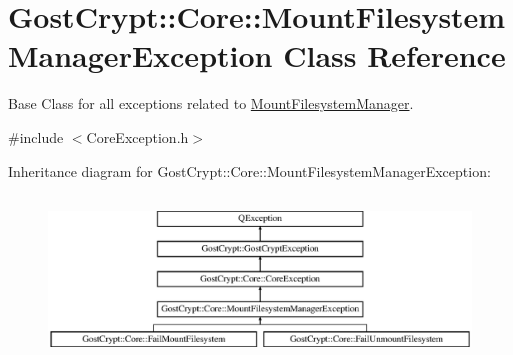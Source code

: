 \hypertarget{class_gost_crypt_1_1_core_1_1_mount_filesystem_manager_exception}{}\section{Gost\+Crypt\+:\+:Core\+:\+:Mount\+Filesystem\+Manager\+Exception Class Reference}
\label{class_gost_crypt_1_1_core_1_1_mount_filesystem_manager_exception}


Base Class for all exceptions related to \hyperlink{class_gost_crypt_1_1_core_1_1_mount_filesystem_manager}{Mount\+Filesystem\+Manager}.  




{\ttfamily \#include $<$Core\+Exception.\+h$>$}

Inheritance diagram for Gost\+Crypt\+:\+:Core\+:\+:Mount\+Filesystem\+Manager\+Exception\+:\begin{figure}[H]
\begin{center}
\leavevmode
\includegraphics[height=4.430379cm]{class_gost_crypt_1_1_core_1_1_mount_filesystem_manager_exception}
\end{center}
\end{figure}
